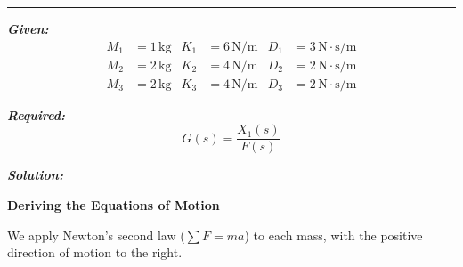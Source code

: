 \documentclass[11pt]{article}
\newcommand{\hspring}[2]{%
      \draw[spring] (#1) -- ++(2,0) node[midway, above=0.25cm]{#2};
    }
\newcommand{\hdamper}[2]{%
      \begin{scope}[shift={#1}]
        \draw (0,0) -- (0.5,0);                  %
        \draw (0.5,0) -- (0.5,0.3) -- (1.5,0.3);  %
        \draw (0.5,0) -- (0.5,-0.3) -- (1.5,-0.3);%
        
        \draw (1.0,0) -- (1.0,0.15);
        \draw (1.0,0) -- (1.0,-0.15);
        
        \draw (1.0,0) -- (2.0,0);
    
        \node[above] at (1,0.3) {#2};
      \end{scope}
    }
\newcommand{\tbody}[4]{
    \node[tbody] (#4) at (#1) {#2};
    \node at ([yshift=20mm]#4.center) {#3};
    \draw ([yshift=11mm]#4.center) -- ([yshift=18mm]#4.center);
    \draw[->] ([yshift=16mm, xshift=-4mm]#4.center) -- ([yshift=16mm, xshift=5mm]#4.center);
    }
\begin{document}
\begin{center}
\end{center}

\noindent\rule{\textwidth}{1pt}

\vspace{12pt}

\noindent\textbf{\textit{Given:}}
\[
\begin{aligned}
M_1 &= 1\, \text{kg} & K_1 &= 6\, \text{N/m} & D_1 &= 3\, \text{N}\cdot\text{s/m} \\
M_2 &= 2\, \text{kg} & K_2 &= 4\, \text{N/m} & D_2 &= 2\, \text{N}\cdot\text{s/m} \\
M_3 &= 2\, \text{kg} & K_3 &= 4\, \text{N/m} & D_3 &= 2\, \text{N}\cdot\text{s/m}
\end{aligned}
\]

\vspace{12pt}

\noindent \textbf{\textit{Required:}}
\[
G(s) = \frac{X_1(s)}{F(s)}
\]

\vspace{12pt}

\noindent \textbf{\textit{Solution:}}

\vspace{12pt}

\noindent \textbf{Deriving the Equations of Motion}
\vspace{12pt}

\noindent We apply Newton's second law ($\sum F = ma$) to each mass, with the positive direction of motion to the right. 
\end{document}
